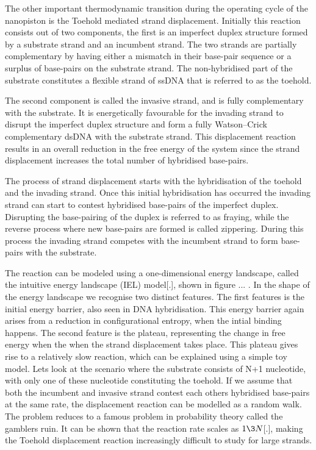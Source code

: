 The other important thermodynamic transition during the operating cycle of the nanopiston
is the Toehold mediated strand displacement. Initially this reaction consists out of two
components, the first is an imperfect duplex structure formed by a substrate strand and
an incumbent strand. The two strands are partially complementary by having either a
mismatch in their base-pair sequence or a surplus of base-pairs on the substrate strand.
The non-hybridised part of the substrate constitutes a flexible strand of ssDNA
that is referred to as the toehold.

The second component is called the invasive strand, and is fully complementary with the
substrate. It is energetically favourable for the invading
strand to disrupt the imperfect duplex structure and form a fully Watson–Crick
complementary dsDNA with the substrate strand. This displacement reaction results in an
overall reduction in the free energy of the system since the strand displacement
increases the total number of hybridised base-pairs.

The process of strand displacement starts with the hybridisation of the toehold and the
invading strand. Once this initial hybridisation has occurred the invading strand can
start to contest hybridised base-pairs of the imperfect duplex. Disrupting the
base-pairing of the duplex is referred to as fraying, while the reverse process
where new base-pairs are formed is called zippering. During this process the invading
strand competes with the incumbent strand to form base-pairs with the substrate.

The reaction can be modeled using a one-dimensional energy landscape, called the
intuitive energy landscape (IEL) model[.], shown in figure ... . In the shape of the
energy landscape we recognise two distinct features. The first features is the initial
energy barrier, also seen in DNA hybridisation. This energy barrier again arises from a
reduction in configurational entropy, when the intial binding happens. The second feature
is the plateau, representing the change in free energy when the when the strand
displacement takes place. This plateau gives rise to a relatively slow reaction, which
can be explained using a simple toy model. Lets look at the scenario where the substrate
consists of N+1 nucleotide, with only one of these nucleotide constituting the toehold.
If we assume that both the incumbent and invasive strand contest each others hybridised
base-pairs at the same rate, the displacement reaction can be modelled as a random walk.
The problem reduces to a famous problem in probability theory called the gamblers ruin.
It can be shown that the reaction rate scales as $1\3N$[.], making the Toehold
displacement reaction increasingly difficult to study for large strands.

